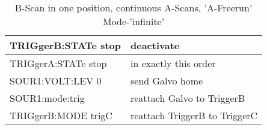 		\begin{table}[h!]
		\scriptsize
			 \begin{tabular}{|p{5.5cm}|p{6cm}|} \hline
			TRIGgerB:STATe stop	& deactivate	\\ \hline
			TRIGgerA:STATe stop	& in exactly this order	\\ \hline
			SOUR1:VOLT:LEV 0	& send Galvo home	\\ \hline
			SOUR1:mode:trig		& reattach Galvo to TriggerB	\\ \hline
			TRIGgerB:MODE trigC & reattach TriggerB to TriggerC \\ \hline
			 \end{tabular}
			 \caption{ B-Scan in one position, continuous A-Scans, 'A-Freerun'
			Mode-'infinite'
			 }
		\end{table}

